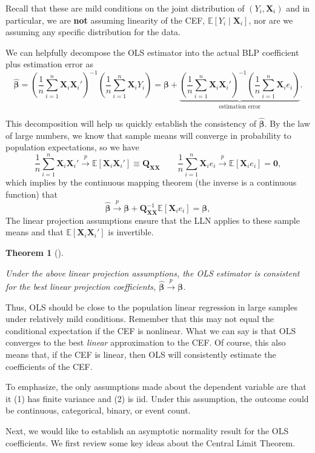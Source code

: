 \documentclass[
  13pt,
  letterpaper,
  DIV=11,
  numbers=noendperiod]{scrreprt}
\newcommand{\mb}{\symbf}
\newcommand{\E}{\mathbb{E}}
\newcommand{\X}{\mb{X}}
\newcommand{\bfbeta}{\mb{\beta}}
\newcommand{\bhat}{\widehat{\mb{\beta}}}
\newcommand{\inprob}{\overset{p}{\to}}
\theoremstyle{definition}
\theoremstyle{definition}
\theoremstyle{plain}
\newtheorem{theorem}{Theorem}[chapter]
\theoremstyle{remark}
\begin{document}
Recall that these are mild conditions on the joint distribution of
\((Y_{i}, \X_{i})\) and in particular, we are \textbf{not} assuming
linearity of the CEF, \(\E[Y_{i} \mid \X_{i}]\), nor are we assuming any
specific distribution for the data.

We can helpfully decompose the OLS estimator into the actual BLP
coefficient plus estimation error as \[ 
\bhat = \left( \frac{1}{n} \sum_{i=1}^n \X_i\X_i' \right)^{-1} \left( \frac{1}{n} \sum_{i=1}^n \X_iY_i \right) = \bfbeta + \underbrace{\left( \frac{1}{n} \sum_{i=1}^n \X_i\X_i' \right)^{-1} \left( \frac{1}{n} \sum_{i=1}^n \X_ie_i \right)}_{\text{estimation error}}.
\]

This decomposition will help us quickly establish the consistency of
\(\bhat\). By the law of large numbers, we know that sample means will
converge in probability to population expectations, so we have \[ 
\frac{1}{n} \sum_{i=1}^n \X_i\X_i' \inprob \E[\X_i\X_i'] \equiv \mb{Q}_{\X\X} \qquad \frac{1}{n} \sum_{i=1}^n \X_ie_i \inprob \E[\X_{i} e_{i}] = \mb{0},
\] which implies by the continuous mapping theorem (the inverse is a
continuous function) that \[
\bhat \inprob \bfbeta + \mb{Q}_{\X\X}^{-1}\E[\X_ie_i] = \bfbeta,
\] The linear projection assumptions ensure that the LLN applies to
these sample means and that \(\E[\X_{i}\X_{i}']\) is invertible.

\begin{theorem}[]\protect\hypertarget{thm-ols-consistency}{}\label{thm-ols-consistency}

Under the above linear projection assumptions, the OLS estimator is
consistent for the best linear projection coefficients,
\(\bhat \inprob \bfbeta\).

\end{theorem}

Thus, OLS should be close to the population linear regression in large
samples under relatively mild conditions. Remember that this may not
equal the conditional expectation if the CEF is nonlinear. What we can
say is that OLS converges to the best \emph{linear} approximation to the
CEF. Of course, this also means that, if the CEF is linear, then OLS
will consistently estimate the coefficients of the CEF.

To emphasize, the only assumptions made about the dependent variable are
that it (1) has finite variance and (2) is iid. Under this assumption,
the outcome could be continuous, categorical, binary, or event count.

Next, we would like to establish an asymptotic normality result for the
OLS coefficients. We first review some key ideas about the Central Limit
Theorem.
\end{document}
